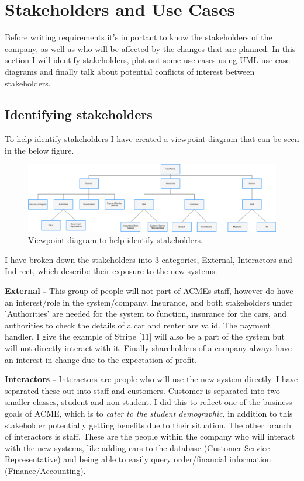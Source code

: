 \section{Stakeholders and Use Cases}
  Before writing requirements it's important to know the stakeholders of the company, as well as who will be affected by the changes that are planned.
  In this section I will identify stakeholders, plot out some use cases using UML use case diagrams and finally talk about potential conflicts of
  interest between stakeholders.

  \subsection{Identifying stakeholders}
    To help identify stakeholders I have created a viewpoint diagram that can be seen in the below figure.
    \begin{figure}[H]
      \centering
      \includegraphics[width=12cm]{diagrams/viewpoints.drawio.png}
      \caption{Viewpoint diagram to help identify stakeholders.}
      \label{fig:viewpoint}
    \end{figure}

    I have broken down the stakeholders into 3 categories, External, Interactors and Indirect, which describe their
    exposure to the new systems.

    \vspace{0.2cm}

    \noindent\textbf{External -} This group of people will not part of ACMEs staff, however do have an interest/role in the system/company. Insurance, 
    and both stakeholders under 'Authorities' are needed for the system to function, insurance for the cars, and authorities to
    check the details of a car and renter are valid. The payment handler, I give the example of Stripe [11] will also be a part of the system
    but will not directly interact with it. Finally shareholders of a company always have an interest in change due to the expectation of profit.

    \vspace{0.2cm}

    \noindent\textbf{Interactors -} Interactors are people who will use the new system directly. I have separated these out into staff and customers.
    Customer is separated into two smaller classes, student and non-student. I did this to reflect one of the business goals of ACME, which is to \textit{
    cater to the student demographic}, in addition to this stakeholder potentially getting benefits due to their situation. The other branch of interactors
    is staff. These are the people within the company who will interact with the new systems, like adding cars to the database (Customer Service Representative)
    and being able to easily query order/financial information (Finance/Accounting).


